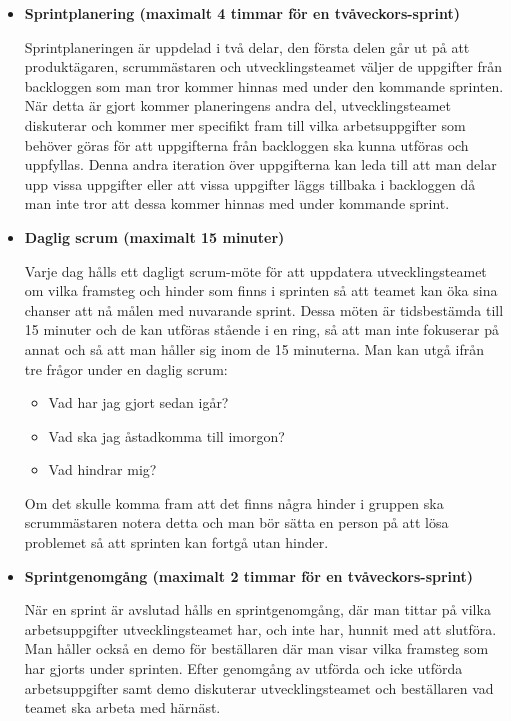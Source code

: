 \begin{itemize}
	\item \textbf{Sprintplanering (maximalt 4 timmar för en tvåveckors-sprint)}
	
	Sprintplaneringen är uppdelad i två delar, den första delen går ut på att produktägaren, scrummästaren och utvecklingsteamet väljer de uppgifter från backloggen som man tror kommer hinnas med under den kommande sprinten. När detta är gjort kommer planeringens andra del, utvecklingsteamet diskuterar och kommer mer specifikt fram till vilka arbetsuppgifter som behöver göras för att uppgifterna från backloggen ska kunna utföras och uppfyllas. Denna andra iteration över uppgifterna kan leda till att man delar upp vissa uppgifter eller att vissa uppgifter läggs tillbaka i backloggen då man inte tror att dessa kommer hinnas med under kommande sprint.
	
	\item \textbf{Daglig scrum (maximalt 15 minuter)}
	
	Varje dag hålls ett dagligt scrum-möte för att uppdatera utvecklingsteamet om vilka framsteg och hinder som finns i sprinten så att teamet kan öka sina chanser att nå målen med nuvarande sprint. Dessa möten är tidsbestämda till 15 minuter och de kan utföras stående i en ring, så att man inte fokuserar på annat och så att man håller sig inom de 15 minuterna. Man kan utgå ifrån tre frågor under en daglig scrum:
	
	\begin{itemize}
		\item Vad har jag gjort sedan igår?
		\item Vad ska jag åstadkomma till imorgon?
		\item Vad hindrar mig?
	\end{itemize}
	
	Om det skulle komma fram att det finns några hinder i gruppen ska scrummästaren notera detta och man bör sätta en person på att lösa problemet så att sprinten kan fortgå utan hinder.
	
	\item \textbf{Sprintgenomgång (maximalt 2 timmar för en tvåveckors-sprint)}
	
	När en sprint är avslutad hålls en sprintgenomgång, där man tittar på vilka arbetsuppgifter utvecklingsteamet har, och inte har, hunnit med att slutföra. Man håller också en demo för beställaren där man visar vilka framsteg som har gjorts under sprinten. Efter genomgång av utförda och icke utförda arbetsuppgifter samt demo diskuterar utvecklingsteamet och beställaren vad teamet ska arbeta med härnäst.
	 

\end{itemize}
